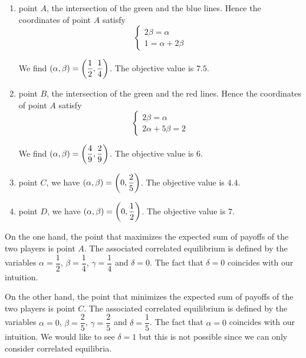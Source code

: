 \begin{enumerate}
    \item point $A$, the intersection of the green and the blue lines. Hence the coordinates of point $A$ satisfy
    \begin{equation*}
       \begin{cases}
        2 \beta = \alpha  \\
        1 = \alpha + 2 \beta
        \end{cases}
    \end{equation*}

    We find $\left(\alpha, \beta\right) = \left(\dfrac{1}{2}, \dfrac{1}{4}\right)$. The objective value is $7.5$.

    \item point $B$, the intersection of the green and the red lines. Hence the coordinates of point $A$ satisfy
    \begin{equation*}
       \begin{cases}
        2 \beta = \alpha  \\
        2 \alpha + 5 \beta = 2
        \end{cases}
    \end{equation*}

    We find $\left(\alpha, \beta\right) = \left(\dfrac{4}{9}, \dfrac{2}{9}\right)$. The objective value is $6$.

    \item point $C$, we have $\left(\alpha, \beta\right) = \left(0, \dfrac{2}{5}\right)$. The objective value is $4.4$.

    \item point $D$, we have $\left(\alpha, \beta\right) = \left(0, \dfrac{1}{2}\right)$. The objective value is $7$.
\end{enumerate}

On the one hand, the point that maximizes the expected sum of payoffs of the two players is point $A$. The associated correlated equilibrium is defined by the variables $\alpha = \dfrac{1}{2}$, $\beta = \dfrac{1}{4}$, $\gamma = \dfrac{1}{4}$ and $\delta = 0$. The fact that $\delta = 0$ coincides with our intuition.



On the other hand, the point that minimizes the expected sum of payoffs of the two players is point $C$. The associated correlated equilibrium is defined by the variables $\alpha = 0$, $\beta = \dfrac{2}{5}$, $\gamma = \dfrac{2}{5}$ and $\delta = \dfrac{1}{5}$. The fact that $\alpha = 0$ coincides with our intuition. We would like to see $\delta = 1$ but this is not possible since we can only consider correlated equilibria.
